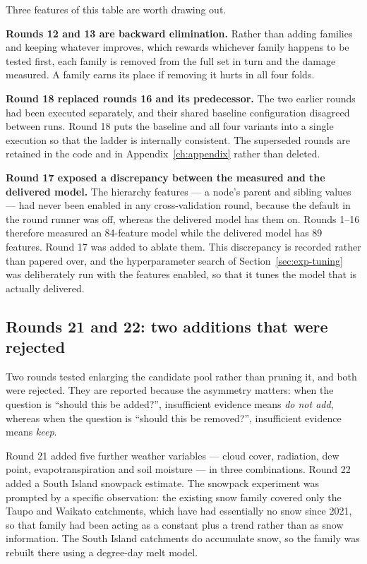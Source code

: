 Three features of this table are worth drawing out.

\textbf{Rounds 12 and 13 are backward elimination.} Rather than adding families and
keeping whatever improves, which rewards whichever family happens to be tested first, each
family is removed from the full set in turn and the damage measured. A family earns its
place if removing it hurts in all four folds.

\textbf{Round 18 replaced rounds 16 and its predecessor.} The two earlier rounds had been
executed separately, and their shared baseline configuration disagreed between runs. Round
18 puts the baseline and all four variants into a single execution so that the ladder is
internally consistent. The superseded rounds are retained in the code and in
Appendix~\ref{ch:appendix} rather than deleted.

\textbf{Round 17 exposed a discrepancy between the measured and the delivered model.} The
hierarchy features --- a node's parent and sibling values --- had never been enabled in any
cross-validation round, because the default in the round runner was off, whereas the
delivered model has them on. Rounds 1--16 therefore measured an 84-feature model while the
delivered model has 89 features. Round 17 was added to ablate them. This discrepancy is
recorded rather than papered over, and the hyperparameter search of
Section~\ref{sec:exp-tuning} was deliberately run with the features enabled, so that it
tunes the model that is actually delivered.

\subsection{Rounds 21 and 22: two additions that were rejected}
\label{sec:exp-negative}

Two rounds tested enlarging the candidate pool rather than pruning it, and both were
rejected. They are reported because the asymmetry matters: when the question is
``should this be added?'', insufficient evidence means \emph{do not add}, whereas when the
question is ``should this be removed?'', insufficient evidence means \emph{keep}.

Round 21 added five further weather variables --- cloud cover, radiation, dew point,
evapotranspiration and soil moisture --- in three combinations. Round 22 added a South
Island snowpack estimate. The snowpack experiment was prompted by a specific observation:
the existing snow family covered only the Taupo and Waikato catchments, which have had
essentially no snow since 2021, so that family had been acting as a constant plus a trend
rather than as snow information. The South Island catchments do accumulate snow, so the
family was rebuilt there using a degree-day melt model.

